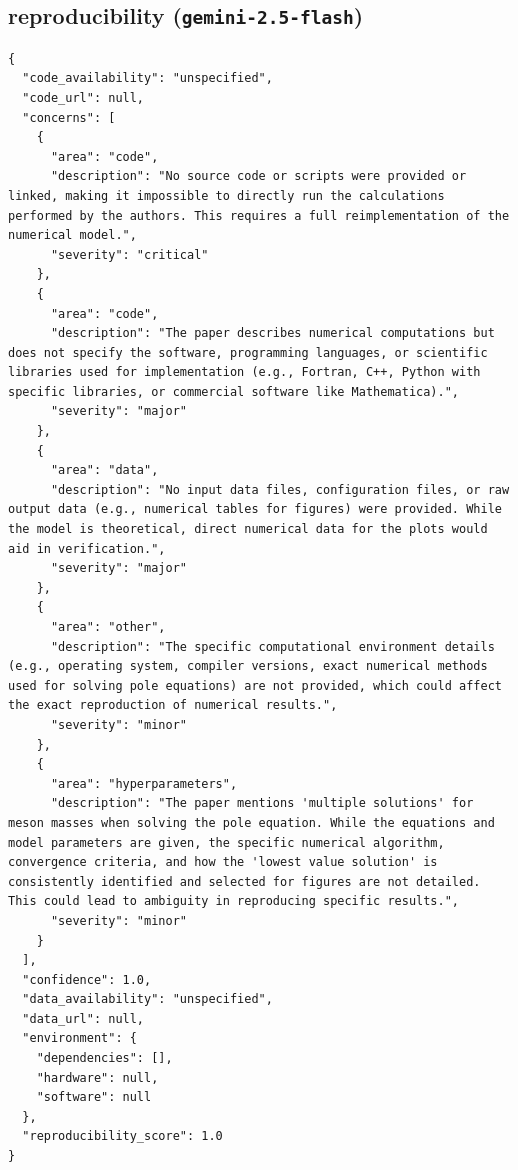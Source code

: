 \documentclass[11pt]{article}
\begin{document}
\subsection*{reproducibility (\texttt{gemini-2.5-flash})}
\begin{verbatim}
{
  "code_availability": "unspecified",
  "code_url": null,
  "concerns": [
    {
      "area": "code",
      "description": "No source code or scripts were provided or linked, making it impossible to directly run the calculations performed by the authors. This requires a full reimplementation of the numerical model.",
      "severity": "critical"
    },
    {
      "area": "code",
      "description": "The paper describes numerical computations but does not specify the software, programming languages, or scientific libraries used for implementation (e.g., Fortran, C++, Python with specific libraries, or commercial software like Mathematica).",
      "severity": "major"
    },
    {
      "area": "data",
      "description": "No input data files, configuration files, or raw output data (e.g., numerical tables for figures) were provided. While the model is theoretical, direct numerical data for the plots would aid in verification.",
      "severity": "major"
    },
    {
      "area": "other",
      "description": "The specific computational environment details (e.g., operating system, compiler versions, exact numerical methods used for solving pole equations) are not provided, which could affect the exact reproduction of numerical results.",
      "severity": "minor"
    },
    {
      "area": "hyperparameters",
      "description": "The paper mentions 'multiple solutions' for meson masses when solving the pole equation. While the equations and model parameters are given, the specific numerical algorithm, convergence criteria, and how the 'lowest value solution' is consistently identified and selected for figures are not detailed. This could lead to ambiguity in reproducing specific results.",
      "severity": "minor"
    }
  ],
  "confidence": 1.0,
  "data_availability": "unspecified",
  "data_url": null,
  "environment": {
    "dependencies": [],
    "hardware": null,
    "software": null
  },
  "reproducibility_score": 1.0
}
\end{verbatim}
\end{document}
